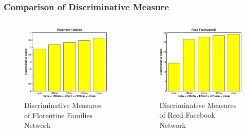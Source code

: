 \documentclass{beamer}
\begin{document}
\begin{frame}
\frametitle{Comparison of Discriminative Measure}
\begin{columns}[T]
\begin{column}{.5\textwidth}
\begin{figure}[h]
\begin{center}
\includegraphics[width=0.76\columnwidth]{discriminative_Florentine}
\end{center}
\caption{Discriminative Measures of Florentine Families Network}
\label{fig:Discriminative measure - Florentine}
\end{figure}
\end{column}
\begin{column}{.5\textwidth}
\begin{figure}[h]
\begin{center}
\includegraphics[width=0.76\columnwidth]{discriminative_Reed}
\end{center}
\caption{Discriminative Measures of Reed Facebook Network}
\label{fig:Discriminative measure - Reed}
\end{figure}
\end{column}
\end{columns}
\end{frame}
\end{document}
